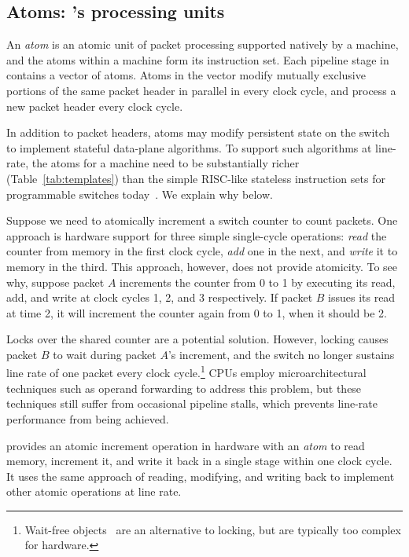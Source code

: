 \subsection{Atoms: \absmachine's processing units}
\label{ss:atoms}
 An {\em atom} is an atomic unit of packet processing supported natively by a
\absmachine machine, and the atoms within a \absmachine machine form its
instruction set. Each pipeline stage in \absmachine contains a vector of atoms.
Atoms in the vector modify mutually exclusive portions of the same packet
header in parallel in every clock cycle, and process a new packet header every
clock cycle.

In addition to packet headers, atoms may modify persistent state on the switch
to implement stateful data-plane algorithms. To support such algorithms at
line-rate, the atoms for a \absmachine machine need to be substantially richer
(Table~\ref{tab:templates}) than the simple RISC-like stateless instruction
sets for programmable switches today~\cite{rmt}. We explain why below.

Suppose we need to atomically increment a switch counter to count packets. One
approach is hardware support for three simple single-cycle operations:
\textit{read} the counter from memory in the first clock cycle, \textit{add}
one in the next, and \textit{write} it to memory in the third.  This approach,
however, does not provide atomicity. To see why, suppose packet $A$ increments
the counter from 0 to 1 by executing its read, add, and write at clock cycles
1, 2, and 3 respectively.  If packet $B$ issues its read at time 2, it will
increment the counter again from 0 to 1, when it should be 2.

Locks over the shared counter are a potential solution.  However, locking
causes packet $B$ to wait during packet $A$'s increment, and the switch no
longer sustains line rate of one packet every clock cycle.\footnote{Wait-free
objects~\cite{herlihy_wait} are an alternative to locking, but are typically
too complex for hardware.} CPUs employ microarchitectural techniques such as
operand forwarding to address this problem, but these techniques still suffer
from occasional pipeline stalls, which prevents line-rate performance from
being achieved.

\absmachine provides an atomic increment operation in hardware with an {\em
atom} to read memory, increment it, and write it back in a single stage within
one clock cycle. It uses the same approach of reading, modifying, and writing
back to implement other atomic operations at line rate.

